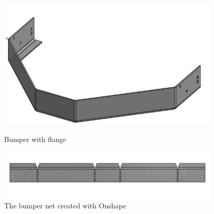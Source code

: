 \begin{figure}[ht]
\centering
\begin{minipage}[b]{.48\textwidth}
  \centering
  \includegraphics[width=0.95\textwidth]{Meetings/November/11-01-21/11-1-21_Hardware_Figure1 - Nathan Forrer.JPG}
  \caption{Bumper with flange}
  \label{fig:pic4}
\end{minipage}%
\hfill%
\begin{minipage}[b]{.48\textwidth}
  \centering
  \includegraphics[width=0.95\textwidth]{Meetings/November/11-01-21/11-1-21_Hardware_Figure2 - Nathan Forrer.JPG}
  \caption{The bumper net created with Onshape}
  \label{fig:pic5}
\end{minipage}
\end{figure}

